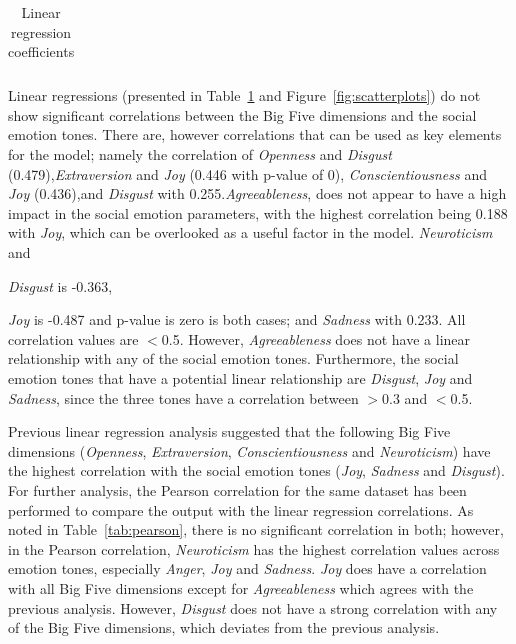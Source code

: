 \documentclass[graybox]{svmult}
\begin{document}
{\begin{table}[!ht]
{\begin{tabular}{@{}llll|lll|lll|lll|lll@{}}
\bottomrule

\end{tabular}%
}
\caption{Linear regression coefficients}
\label{tbl:linreg}
\end{table}

Linear regressions (presented in Table~\ref{tbl:linreg} and
Figure~\ref{fig:scatterplots}) do not show significant correlations
between the Big Five dimensions and the social emotion tones. There are, however correlations that can be used as key elements for
the model; namely the correlation of {\emph{Openness} and
{\emph{Disgust}} (0.479),{\emph{Extraversion}}
and {\emph{Joy}} (0.446 with p-value of
0), {\emph{Conscientiousness}} and {\emph{Joy}} (0.436),and  \emph{Disgust}} with 0.255.{\emph{Agreeableness}},
does not appear to have a high impact in the social emotion
parameters, with the highest correlation being 0.188 with
{\emph{Joy}}, which can be overlooked as a useful factor in the
model. {\emph{Neuroticism}} and {\emph{Disgust} is -0.363, {\emph{Joy}
is -0.487 and p-value is zero is both cases; and {\emph{Sadness}} with
0.233. All correlation values are $<$0.5. However,
{\emph{Agreeableness}} does not have a linear relationship with any of
the social emotion tones. Furthermore, the social emotion tones that
have a potential linear relationship are {\emph{Disgust}},
{\emph{Joy}} and {\emph{Sadness}}, since the three tones have a
correlation between $>$0.3 and $<$0.5.

Previous linear regression analysis suggested that the following Big
Five dimensions ({\emph{Openness}}, {\emph{Extraversion}},
{\emph{Conscientiousness}} and {\emph{Neuroticism}}) have the highest
correlation with the social emotion tones ({\emph{Joy}},
{\emph{Sadness}} and {\emph{Disgust}}). For further analysis, the
Pearson correlation for the same dataset has been performed to compare
the output with the linear regression correlations. As noted in
Table~\ref{tab:pearson}, there is no significant correlation in both;
however, in the Pearson correlation, {\emph{Neuroticism}} has the
highest correlation values across emotion tones, especially
{\emph{Anger}}, {\emph{Joy}} and {\emph{Sadness}}. {\emph{Joy}} does
have a correlation with all Big Five dimensions except for
{\emph{Agreeableness}} which agrees with the previous
analysis. However, {\emph{Disgust}} does not have a strong correlation
with any of the Big Five dimensions, which deviates from the previous
analysis.

}}}
\end{document}
